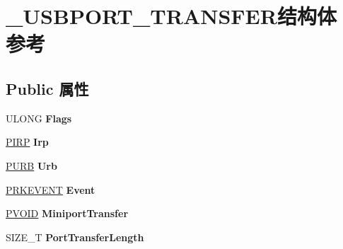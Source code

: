\hypertarget{struct___u_s_b_p_o_r_t___t_r_a_n_s_f_e_r}{}\section{\+\_\+\+U\+S\+B\+P\+O\+R\+T\+\_\+\+T\+R\+A\+N\+S\+F\+E\+R结构体 参考}
\label{struct___u_s_b_p_o_r_t___t_r_a_n_s_f_e_r}
\subsection*{Public 属性}
\begin{DoxyCompactItemize}
\item 
\mbox{\label{struct___u_s_b_p_o_r_t___t_r_a_n_s_f_e_r_add27850f2197166dedc30549ef5761f4}} 
U\+L\+O\+NG {\bfseries Flags}
\item 
\mbox{\label{struct___u_s_b_p_o_r_t___t_r_a_n_s_f_e_r_aabfa7cfc5de4df82e19fb13ec6e32763}} 
\hyperlink{interfacevoid}{P\+I\+RP} {\bfseries Irp}
\item 
\mbox{\label{struct___u_s_b_p_o_r_t___t_r_a_n_s_f_e_r_ad3d970ce58305d57b0b4bfbbba2c7014}} 
\hyperlink{struct___u_r_b}{P\+U\+RB} {\bfseries Urb}
\item 
\mbox{\label{struct___u_s_b_p_o_r_t___t_r_a_n_s_f_e_r_a3e653d22ad5cdefec09bfd879cceed20}} 
\hyperlink{struct___k_e_v_e_n_t}{P\+R\+K\+E\+V\+E\+NT} {\bfseries Event}
\item 
\mbox{\label{struct___u_s_b_p_o_r_t___t_r_a_n_s_f_e_r_a7e134e02470288380304b2b9f208e4a0}} 
\hyperlink{interfacevoid}{P\+V\+O\+ID} {\bfseries Miniport\+Transfer}
\item 
\mbox{\label{struct___u_s_b_p_o_r_t___t_r_a_n_s_f_e_r_a096c92519dfc080d88f84e5407d4232f}} 
S\+I\+Z\+E\+\_\+T {\bfseries Port\+Transfer\+Length}
\item 
\mbox{\label{struct___u_s_b_p_o_r_t___t_r_a_n_s_f_e_r_ad18396b3e8fd366945298102044471ea}} 

\end{DoxyCompactItemize}
